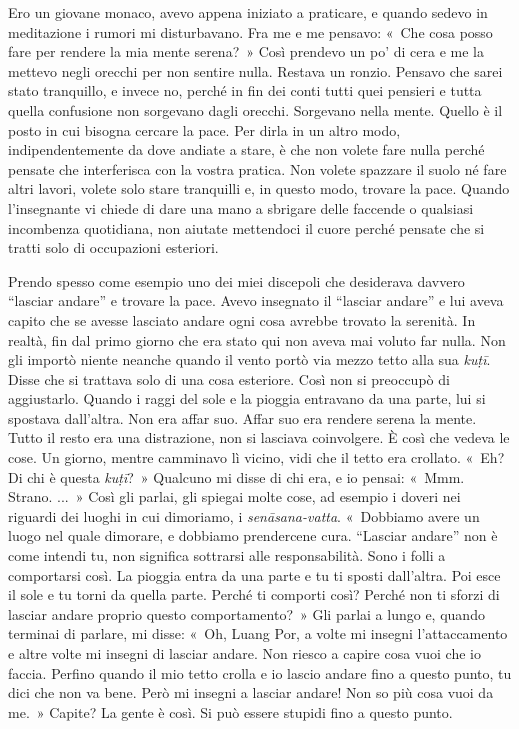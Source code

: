 Ero un giovane monaco, avevo appena iniziato a praticare, e quando
sedevo in meditazione i rumori mi disturbavano. Fra me e me pensavo:
«~Che cosa posso fare per rendere la mia mente serena?~» Così prendevo
un po' di cera e me la mettevo negli orecchi per non sentire nulla.
Restava un ronzio. Pensavo che sarei stato tranquillo, e invece no,
perché in fin dei conti tutti quei pensieri e tutta quella confusione
non sorgevano dagli orecchi. Sorgevano nella mente. Quello è il posto in
cui bisogna cercare la pace. Per dirla in un altro modo,
indipendentemente da dove andiate a stare, è che non volete fare nulla
perché pensate che interferisca con la vostra pratica. Non volete
spazzare il suolo né fare altri lavori, volete solo stare tranquilli e,
in questo modo, trovare la pace. Quando l'insegnante vi chiede di dare
una mano a sbrigare delle faccende o qualsiasi incombenza quotidiana,
non aiutate mettendoci il cuore perché pensate che si tratti solo di
occupazioni esteriori.

Prendo spesso come esempio uno dei miei discepoli che desiderava davvero
``lasciar andare'' e trovare la pace. Avevo insegnato il ``lasciar
andare'' e lui aveva capito che se avesse lasciato andare ogni cosa
avrebbe trovato la serenità. In realtà, fin dal primo giorno che era
stato qui non aveva mai voluto far nulla. Non gli importò niente neanche
quando il vento portò via mezzo tetto alla sua \emph{kuṭī}. Disse che si
trattava solo di una cosa esteriore. Così non si preoccupò di
aggiustarlo. Quando i raggi del sole e la pioggia entravano da una
parte, lui si spostava dall'altra. Non era affar suo. Affar suo era
rendere serena la mente. Tutto il resto era una distrazione, non si
lasciava coinvolgere. È così che vedeva le cose. Un giorno, mentre
camminavo lì vicino, vidi che il tetto era crollato. «~Eh? Di chi è
questa \emph{kuṭī}?~» Qualcuno mi disse di chi era, e io pensai: «~Mmm.
Strano. ...~» Così gli parlai, gli spiegai molte cose, ad esempio i
doveri nei riguardi dei luoghi in cui dimoriamo, i
\emph{senāsana-vatta}. «~Dobbiamo avere un luogo nel quale dimorare, e
dobbiamo prendercene cura. ``Lasciar andare'' non è come intendi tu, non
significa sottrarsi alle responsabilità. Sono i folli a comportarsi
così. La pioggia entra da una parte e tu ti sposti dall'altra. Poi esce
il sole e tu torni da quella parte. Perché ti comporti così? Perché non
ti sforzi di lasciar andare proprio questo comportamento?~» Gli parlai
a lungo e, quando terminai di parlare, mi disse: «~Oh, Luang Por, a
volte mi insegni l'attaccamento e altre volte mi insegni di lasciar
andare. Non riesco a capire cosa vuoi che io faccia. Perfino quando il
mio tetto crolla e io lascio andare fino a questo punto, tu dici che non
va bene. Però mi insegni a lasciar andare! Non so più cosa vuoi da me.~»
Capite? La gente è così. Si può essere stupidi fino a questo punto.

